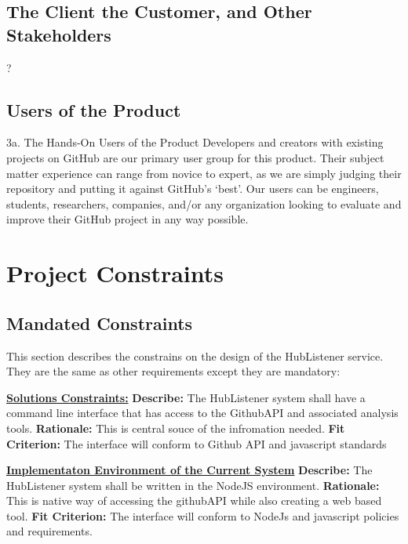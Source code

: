 \documentclass{article}
\begin{document}
\subsection{The Client the Customer, and Other Stakeholders}
?
\subsection{Users of the Product}
3a. The Hands-On Users of the Product
Developers and creators with existing projects on GitHub are our primary user group for this product. Their subject matter experience can range from novice to expert, as we are simply judging their repository and putting it against GitHub’s ‘best’. Our users can be engineers, students, researchers, companies, and/or any organization looking to evaluate and improve their GitHub project in any way possible. 




\newpage
\section{Project Constraints}
\subsection{Mandated Constraints}

This section describes the constrains on the design of the HubListener service. They are the same as other requirements except they are mandatory:\newline
\newline

\noindent
\textbf{\underline{Solutions Constraints:}}\newline
\textbf{Describe:}  The HubListener system shall have a command line interface that has access to the GithubAPI and associated analysis tools.\newline
\textbf{Rationale:} This is central souce of the infromation needed. \newline
\textbf{Fit Criterion:}  The interface will conform to Github API and javascript standards \newline

\noindent
\textbf{\underline{Implementaton Environment of the Current System}}\newline
\textbf{Describe:}  The HubListener system shall be written in the NodeJS environment.\newline
\textbf{Rationale:} This is native way of accessing the githubAPI while also creating a web based tool.\newline 
\textbf{Fit Criterion:}  The interface will conform to NodeJs and javascript policies and requirements. \newline
\end{document}
